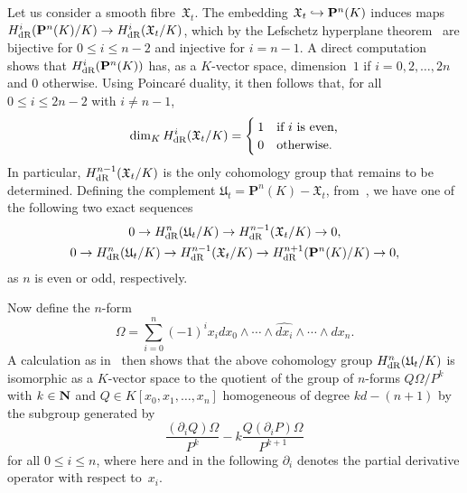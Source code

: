 Let us consider a smooth fibre~$\mathfrak{X}_t$.  The embedding 
$\mathfrak{X}_t \hookrightarrow \mathbf{P}^n(K)$ induces maps 
$H_{\text{dR}}^i(\mathbf{P}^n(K)/K) \rightarrow H_{\text{dR}}^i(\mathfrak{X}_t/K)$, which 
by the Lefschetz hyperplane theorem~\citep[\S 1.2, p.\ 156]{GriffithsHarris1978} 
are bijective for $0 \leq i \leq n-2$ and injective for $i = n-1$.  A direct 
computation~\citep[Corollary~3.1.4]{AbbottKedlayaRoe2006} shows that 
$H_{\text{dR}}^i(\mathbf{P}^n(K))$ has, as a $K$-vector space, dimension~$1$ if 
$i = 0, 2, \dotsc, 2n$ and $0$ otherwise.  Using Poincar\'e duality, it then 
follows that, for all $0 \leq i \leq 2n-2$ with $i \neq n-1$, 
\begin{equation}
\dim_K H_{\text{dR}}^i(\mathfrak{X}_t/K) = \begin{cases} 1 & \text{if $i$ is even,} \\ 
                                    0 & \text{otherwise.} \end{cases}
\end{equation}
In particular, $H_{\text{dR}}^{n-1}(\mathfrak{X}_t/K)$ is the only 
cohomology group that remains to be determined.  Defining the complement 
$\mathfrak{U}_t = \mathbf{P}^n(K) - \mathfrak{X}_t$, 
from~\citep[(10.16)]{Griffiths1969}, we have one of the following two exact 
sequences
\begin{gather}
0 \rightarrow H_{\text{dR}}^n(\mathfrak{U}_t/K) \rightarrow H_{\text{dR}}^{n-1}(\mathfrak{X}_t/K) \rightarrow 0, \\
0 \rightarrow H_{\text{dR}}^n(\mathfrak{U}_t/K) \rightarrow H_{\text{dR}}^{n-1}(\mathfrak{X}_t/K) \rightarrow H_{\text{dR}}^{n+1}(\mathbf{P}^n(K)/K) \rightarrow 0,
\end{gather}
as $n$ is even or odd, respectively.

Now define the $n$-form 
\begin{equation}
\Omega = \sum_{i=0}^n (-1)^i x_i d x_0 \wedge \dotsb \wedge \widehat{d x_i} \wedge \dotsb \wedge d x_n.
\end{equation}
A calculation as in~\citep[\S 4]{Griffiths1969} then shows that the 
above cohomology group $H_{\text{dR}}^n(\mathfrak{U}_t/K)$ is isomorphic as a 
$K$-vector space to the quotient of the group of $n$-forms $Q \Omega / P^k$ 
with $k \in \mathbf{N}$ and $Q \in K[x_0, x_1, \dotsc, x_n]$ homogeneous of degree 
$k d - (n + 1)$ by the subgroup generated by 
\begin{equation} \label{eq:PoleReductionQuotient}
\frac{(\partial_i Q) \Omega}{P^k} - k \frac{Q (\partial_i P) \Omega}{P^{k+1}}
\end{equation}
for all $0 \leq i \leq n$, where here and in the following $\partial_i$ 
denotes the partial derivative operator with respect to~$x_i$.

